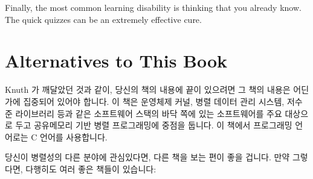 Finally, the most common learning disability is thinking that
you already know.
The quick quizzes can be an extremely effective cure.
\fi

\section{Alternatives to This Book}
\label{sec:Alternatives to This Book}

Knuth 가 깨달았던 것과 같이, 당신의 책의 내용에 끝이 있으려면 그 책의 내용은
어딘가에 집중되어 있어야 합니다.  이 책은 운영체제 커널, 병렬 데이터 관리
시스템, 저수준 라이브러리 등과 같은 소프트웨어 스택의 바닥 쪽에 있는
소프트웨어를 주요 대상으로 두고 공유메모리 기반 병렬 프로그래밍에 중점을
둡니다.
이 책에서 프로그래밍 언어로는 C 언어를 사용합니다.

\iffalse
As Knuth learned, if you want your book to be finite, it must be focused.
This book focuses on shared-memory parallel programming, with an
emphasis on software that lives near the bottom of the software stack,
such as operating-system kernels, parallel data-management systems,
low-level libraries, and the like.
The programming language used by this book is C.
\fi

당신이 병렬성의 다른 분야에 관심있다면, 다른 책을 보는 편이 좋을 겁니다.
만약 그렇다면, 다행히도 여러 좋은 책들이 있습니다:

\iffalse
If you are interested in other aspects of parallelism, you might well
be better served by some other book.
Fortunately, there are many alternatives available to you:
\fi

